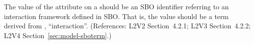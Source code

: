 The value of the  attribute on a \Model should be
an SBO identifier referring to an interaction framework defined
in SBO.  That is, the value should be a term derived from
\sbointeractionID, ``interaction''.  (References: L2V2
Section~4.2.1; L2V3 Section~4.2.2; L2V4 Section~\ref{sec:model-sboterm}.)
